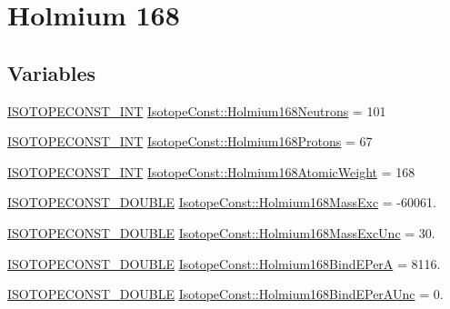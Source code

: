 \hypertarget{group___isotope_const-_holmium-_ho168}{}\section{Holmium 168}
\label{group___isotope_const-_holmium-_ho168}
\subsection*{Variables}
\begin{DoxyCompactItemize}
\item 
\mbox{\hyperlink{group___isotope_const-_macros_ga5f18360b3e99483a35c32d789e62621c}{I\+S\+O\+T\+O\+P\+E\+C\+O\+N\+S\+T\+\_\+\+I\+NT}} \mbox{\hyperlink{group___isotope_const-_holmium-_ho168_gab83a236d472f21be256b81b8475ede4f}{Isotope\+Const\+::\+Holmium168\+Neutrons}} = 101
\item 
\mbox{\hyperlink{group___isotope_const-_macros_ga5f18360b3e99483a35c32d789e62621c}{I\+S\+O\+T\+O\+P\+E\+C\+O\+N\+S\+T\+\_\+\+I\+NT}} \mbox{\hyperlink{group___isotope_const-_holmium-_ho168_gae3cbf6efc4193367fb62bc1f692c553e}{Isotope\+Const\+::\+Holmium168\+Protons}} = 67
\item 
\mbox{\hyperlink{group___isotope_const-_macros_ga5f18360b3e99483a35c32d789e62621c}{I\+S\+O\+T\+O\+P\+E\+C\+O\+N\+S\+T\+\_\+\+I\+NT}} \mbox{\hyperlink{group___isotope_const-_holmium-_ho168_gaa305c9e6cb3cbb8e90265706d14aa908}{Isotope\+Const\+::\+Holmium168\+Atomic\+Weight}} = 168
\item 
\mbox{\hyperlink{group___isotope_const-_macros_ga8f45a7272ce02c0b4c65c44636ed719a}{I\+S\+O\+T\+O\+P\+E\+C\+O\+N\+S\+T\+\_\+\+D\+O\+U\+B\+LE}} \mbox{\hyperlink{group___isotope_const-_holmium-_ho168_gadc45ff266477784b605f34c47a7569f3}{Isotope\+Const\+::\+Holmium168\+Mass\+Exc}} = -\/60061.
\item 
\mbox{\hyperlink{group___isotope_const-_macros_ga8f45a7272ce02c0b4c65c44636ed719a}{I\+S\+O\+T\+O\+P\+E\+C\+O\+N\+S\+T\+\_\+\+D\+O\+U\+B\+LE}} \mbox{\hyperlink{group___isotope_const-_holmium-_ho168_gab7263921a38f1b83c8bf6988da8b828b}{Isotope\+Const\+::\+Holmium168\+Mass\+Exc\+Unc}} = 30.
\item 
\mbox{\hyperlink{group___isotope_const-_macros_ga8f45a7272ce02c0b4c65c44636ed719a}{I\+S\+O\+T\+O\+P\+E\+C\+O\+N\+S\+T\+\_\+\+D\+O\+U\+B\+LE}} \mbox{\hyperlink{group___isotope_const-_holmium-_ho168_ga39897ba372b19a9915b8af2391d60407}{Isotope\+Const\+::\+Holmium168\+Bind\+E\+PerA}} = 8116.
\item 
\mbox{\hyperlink{group___isotope_const-_macros_ga8f45a7272ce02c0b4c65c44636ed719a}{I\+S\+O\+T\+O\+P\+E\+C\+O\+N\+S\+T\+\_\+\+D\+O\+U\+B\+LE}} \mbox{\hyperlink{group___isotope_const-_holmium-_ho168_gaadc9d91298cc92058fc906fc91597363}{Isotope\+Const\+::\+Holmium168\+Bind\+E\+Per\+A\+Unc}} = 0.

\end{DoxyCompactItemize}
